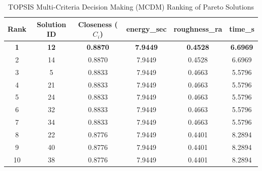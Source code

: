 \begin{table}[htbp]
\centering
\caption{TOPSIS Multi-Criteria Decision Making (MCDM) Ranking of Pareto Solutions}
\label{tab:topsis_ranking}
\begin{tabular}{cccccc}
\toprule
Rank & Solution ID & Closeness ($C_i$) & energy_sec & roughness_ra & time_s \\
\midrule
\textbf{1} & \textbf{12} & \textbf{0.8870} & \textbf{7.9449} & \textbf{0.4528} & \textbf{6.6969} \\
2 & 14 & 0.8870 & 7.9449 & 0.4528 & 6.6969 \\
3 & 5 & 0.8833 & 7.9449 & 0.4663 & 5.5796 \\
4 & 21 & 0.8833 & 7.9449 & 0.4663 & 5.5796 \\
5 & 24 & 0.8833 & 7.9449 & 0.4663 & 5.5796 \\
6 & 32 & 0.8833 & 7.9449 & 0.4663 & 5.5796 \\
7 & 34 & 0.8833 & 7.9449 & 0.4663 & 5.5796 \\
8 & 22 & 0.8776 & 7.9449 & 0.4401 & 8.2894 \\
9 & 40 & 0.8776 & 7.9449 & 0.4401 & 8.2894 \\
10 & 38 & 0.8776 & 7.9449 & 0.4401 & 8.2894 \\
\bottomrule
\end{tabular}
\end{table}